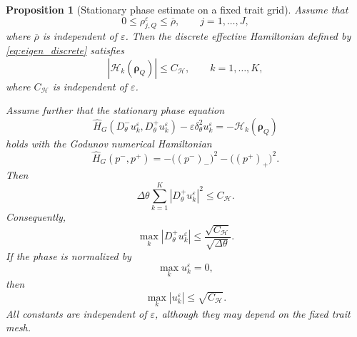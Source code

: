 \documentclass[11pt, dina4, amsfont12]{article}
\newtheorem{proposition}{Proposition}[section]
\begin{document}
\begin{proposition}[Stationary phase estimate on a fixed trait grid]
\label{prop:stationary_phase_estimate}
Assume that
\[
    0\le \rho_{j,Q}^\varepsilon\le \overline\rho,
    \qquad j=1,\ldots,J,
\]
where \(\overline\rho\) is independent of \(\varepsilon\). Then the discrete
effective Hamiltonian defined by \eqref{eq:eigen_discrete} satisfies
\[
    |\mathcal H_k(\boldsymbol\rho_Q)|
    \le C_{\mathcal H},
    \qquad k=1,\ldots,K,
\]
where \(C_{\mathcal H}\) is independent of \(\varepsilon\).

Assume further that the stationary phase equation
\begin{equation}\label{eq:stationary_phase}
    \widehat H_G
    \left(
        D_\theta^-u_k^\varepsilon,
        D_\theta^+u_k^\varepsilon
    \right)
    -
    \varepsilon\delta_\theta^2u_k^\varepsilon
    =
    -\mathcal H_k(\boldsymbol\rho_Q)
\end{equation}
holds with the Godunov numerical Hamiltonian
\[
    \widehat H_G(p^-,p^+)
    =
    -\bigl((p^-)_{-}\bigr)^2
    -
    \bigl((p^+)_{+}\bigr)^2 .
\]
Then
\[
    \Delta\theta
    \sum_{k=1}^K
    |D_\theta^+u_k^\varepsilon|^2
    \le
    C_{\mathcal H}.
\]
Consequently,
\[
    \max_k |D_\theta^+u_k^\varepsilon|
    \le
    \frac{\sqrt{C_{\mathcal H}}}{\sqrt{\Delta\theta}} .
\]
If the phase is normalized by
\[
    \max_k u_k^\varepsilon=0,
\]
then
\[
    \max_k |u_k^\varepsilon|
    \le
    \sqrt{C_{\mathcal H}} .
\]
All constants are independent of \(\varepsilon\), although they may depend on
the fixed trait mesh.
\end{proposition}
\end{document}
